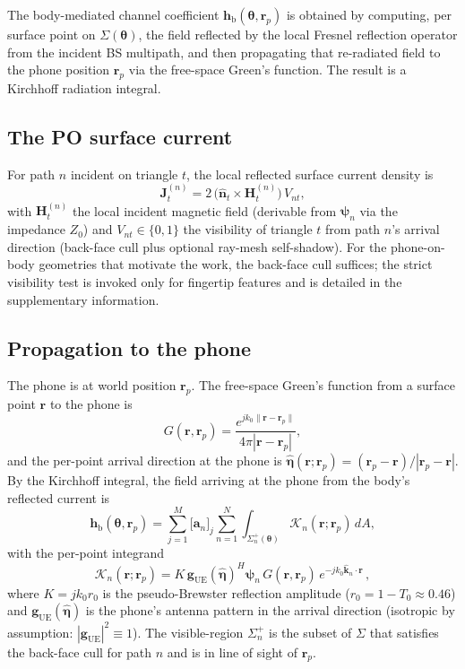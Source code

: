\documentclass[journal,twocolumn,10pt]{IEEEtran}
\theoremstyle{plain}
\theoremstyle{definition}
\theoremstyle{remark}
\newcommand{\nhat}{\hat{\bm{n}}}
\newcommand{\etahat}{\hat{\bm{\eta}}}
\newcommand{\rr}{\mathbf{r}}
\newcommand{\HH}{\mathbf{H}}
\newcommand{\psin}{\bm{\psi}_n}
\newcommand{\thetab}{\bm{\theta}}
\newcommand{\hbody}{\bm{h}_{\mathrm{b}}}
\newcommand{\Tepskin}{T_{0}}
\begin{document}

The body-mediated channel coefficient $\hbody(\thetab,\rr_p)$ is
obtained by computing, per surface point on $\Sigma(\thetab)$, the
field reflected by the local Fresnel reflection operator from the
incident BS multipath, and then propagating that re-radiated field
to the phone position $\rr_p$ via the free-space Green's function.
The result is a Kirchhoff radiation integral.

\subsection{The PO surface current}

For path $n$ incident on triangle $t$, the local reflected surface
current density is
\begin{equation}\label{eq:Js}
\bm{J}^{(n)}_t = 2\,\bigl(\nhat_t \times \HH^{(n)}_t\bigr)\,V_{nt},
\end{equation}
with $\HH^{(n)}_t$ the local incident magnetic field (derivable
from $\psin$ via the impedance $Z_0$) and $V_{nt} \in \{0,1\}$ the
visibility of triangle $t$ from path $n$'s arrival direction
(back-face cull plus optional ray-mesh self-shadow). For the
phone-on-body geometries that motivate the work, the back-face cull
suffices; the strict visibility test is invoked only for fingertip
features and is detailed in the supplementary information.

\subsection{Propagation to the phone}

The phone is at world position $\rr_p$. The free-space Green's
function from a surface point $\rr$ to the phone is
\begin{equation}
G(\rr,\rr_p) = \frac{e^{jk_0 \|\rr-\rr_p\|}}{4\pi|\rr-\rr_p|},
\end{equation}
and the per-point arrival direction at the phone is $\etahat(\rr;\rr_p)
= (\rr_p - \rr) / |\rr_p - \rr|$. By the Kirchhoff integral, the
field arriving at the phone from the body's reflected current is
\begin{equation}\label{eq:kirchhoff-integral}
\hbody(\thetab,\rr_p) = \sum_{j=1}^{M} \bigl[\bm{a}_n\bigr]_j
\sum_{n=1}^{N} \int_{\Sigma_n^{+}(\thetab)} \mathcal{K}_n(\rr;\rr_p)\,dA,
\end{equation}
with the per-point integrand
\begin{equation}\label{eq:kernel}
\mathcal{K}_n(\rr;\rr_p) = K\,\bm{g}_{\mathrm{UE}}(\etahat)^{H}\psin
\,G(\rr,\rr_p)\,e^{-jk_0\hat{\bm{k}}_n\cdot\rr} \,,
\end{equation}
where $K = jk_0 r_0$ is the pseudo-Brewster reflection amplitude
($r_0 = 1 - \Tepskin \approx 0.46$) and
$\bm{g}_{\mathrm{UE}}(\etahat)$ is the phone's antenna pattern in
the arrival direction (isotropic by assumption: $|\bm{g}_{\mathrm{UE}}|^2
\equiv 1$). The visible-region $\Sigma_n^{+}$ is the subset of
$\Sigma$ that satisfies the back-face cull for path $n$ and is in
line of sight of $\rr_p$.
\end{document}
